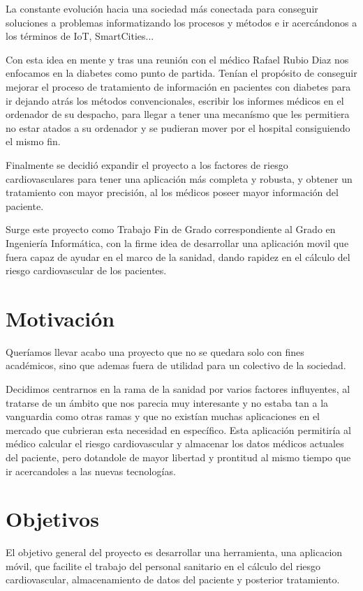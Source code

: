 \documentclass[11pt,spanish,
		listoftables,listoffigures]
		{tfgplantilla}
\begin{document}
La constante evolución hacia una sociedad más conectada para conseguir soluciones a problemas informatizando los procesos y métodos e ir acercándonos a los términos de IoT, SmartCities...

Con esta idea en mente y tras una reunión con el médico Rafael Rubio Diaz nos enfocamos en la diabetes como punto de partida. Tenían el propósito de conseguir mejorar el proceso de tratamiento de información en pacientes con diabetes para ir dejando atrás los métodos convencionales, escribir los informes médicos en el ordenador de su despacho, para llegar a tener una mecanísmo que les permitiera no estar atados a su ordenador y se pudieran mover por el hospital consiguiendo el mismo fin. 

Finalmente se decidió expandir el proyecto a los factores de riesgo cardiovasculares para tener una aplicación más completa y robusta, y obtener un tratamiento con mayor precisión, al los médicos poseer mayor información del paciente.

Surge este proyecto como Trabajo Fin de Grado correspondiente al Grado en Ingeniería Informática, con la firme idea de desarrollar una aplicación movil que fuera capaz de ayudar en el marco de la sanidad, dando rapidez en el cálculo del riesgo cardiovascular de los pacientes.

\section{Motivaci\'on}

Queríamos llevar acabo una proyecto que no se quedara solo con fines académicos, sino que ademas fuera de utilidad para un colectivo de la sociedad. 

Decidimos centrarnos en la rama de la sanidad por varios factores influyentes, al tratarse de un ámbito que nos parecia muy interesante y no estaba tan a la vanguardia como otras ramas y que no existían muchas aplicaciones en el mercado que cubrieran esta necesidad en específico. 
Esta aplicación permitiría al médico calcular el riesgo cardiovascular y almacenar los datos médicos actuales del paciente, pero dotandole de mayor libertad y prontitud al mismo tiempo que ir acercandoles a las nuevas tecnologías.

\vfill
\section{Objetivos}

El objetivo general del proyecto es desarrollar una herramienta, una aplicacion móvil, que facilite el trabajo del personal sanitario en el cálculo del riesgo cardiovascular, almacenamiento de datos del paciente y posterior tratamiento.
\end{document}

